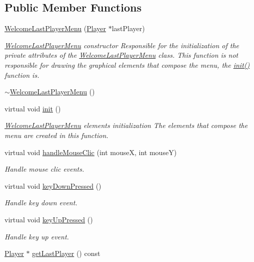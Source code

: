 \subsection*{Public Member Functions}
\begin{DoxyCompactItemize}
\item 
\hyperlink{class_symp_1_1_welcome_last_player_menu_a91f706b9f566d790ff750340b3f9761e}{Welcome\-Last\-Player\-Menu} (\hyperlink{class_symp_1_1_player}{Player} $\ast$last\-Player)
\begin{DoxyCompactList}\small\item\em \hyperlink{class_symp_1_1_welcome_last_player_menu}{Welcome\-Last\-Player\-Menu} constructor Responsible for the initialization of the private attributes of the \hyperlink{class_symp_1_1_welcome_last_player_menu_a91f706b9f566d790ff750340b3f9761e}{Welcome\-Last\-Player\-Menu} class. This function is not responsible for drawing the graphical elements that compose the menu, the \hyperlink{class_symp_1_1_welcome_last_player_menu_a04a8fb21c22309adc020fd074ede1ffc}{init()} function is. \end{DoxyCompactList}\item 
\hyperlink{class_symp_1_1_welcome_last_player_menu_a1acdc429a82e38f08dd80c22e7fef2ae}{$\sim$\-Welcome\-Last\-Player\-Menu} ()
\item 
virtual void \hyperlink{class_symp_1_1_welcome_last_player_menu_a04a8fb21c22309adc020fd074ede1ffc}{init} ()
\begin{DoxyCompactList}\small\item\em \hyperlink{class_symp_1_1_welcome_last_player_menu}{Welcome\-Last\-Player\-Menu} elements initialization The elements that compose the menu are created in this function. \end{DoxyCompactList}\item 
virtual void \hyperlink{class_symp_1_1_welcome_last_player_menu_a372720625563d47b3814c40f836ecc14}{handle\-Mouse\-Clic} (int mouse\-X, int mouse\-Y)
\begin{DoxyCompactList}\small\item\em Handle mouse clic events. \end{DoxyCompactList}\item 
virtual void \hyperlink{class_symp_1_1_welcome_last_player_menu_aa275509ff5be0d17303c7a0bccc6d9fd}{key\-Down\-Pressed} ()
\begin{DoxyCompactList}\small\item\em Handle key down event. \end{DoxyCompactList}\item 
virtual void \hyperlink{class_symp_1_1_welcome_last_player_menu_ab277e548cec10d96524643b117831a52}{key\-Up\-Pressed} ()
\begin{DoxyCompactList}\small\item\em Handle key up event. \end{DoxyCompactList}\item 
\hyperlink{class_symp_1_1_player}{Player} $\ast$ \hyperlink{class_symp_1_1_welcome_last_player_menu_a6913f956df8bb265ac01a587202a676d}{get\-Last\-Player} () const 
\end{DoxyCompactItemize}


